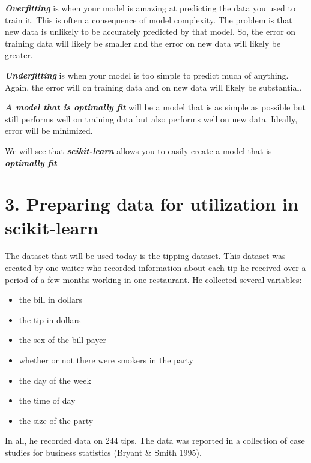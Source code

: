 \documentclass[11pt]{article}
\providecommand{\tightlist}{%
      \setlength{\itemsep}{0pt}\setlength{\parskip}{0pt}}
\begin{document}
    

    \textbf{\emph{Overfitting}} is when your model is amazing at predicting
the data you used to train it. This is often a consequence of model
complexity. The problem is that new data is unlikely to be accurately
predicted by that model. So, the error on training data will likely be
smaller and the error on new data will likely be greater.

    \textbf{\emph{Underfitting}} is when your model is too simple to predict
much of anything. Again, the error will on training data and on new data
will likely be substantial.

    \textbf{\emph{A model that is optimally fit}} will be a model that is as
simple as possible but still performs well on training data but also
performs well on new data. Ideally, error will be minimized.

    We will see that \textbf{\emph{scikit-learn}} allows you to easily
create a model that is \textbf{\emph{optimally fit}}.

    \hypertarget{preparing-data-for-utilization-in-scikit-learn}{%
\section{3. Preparing data for utilization in
scikit-learn}\label{preparing-data-for-utilization-in-scikit-learn}}

    The dataset that will be used today is the
\href{https://drive.google.com/file/d/1JG1dL57ZO-ZyOIIxykP8OCtI58YKC8W4}{tipping
dataset.} This dataset was created by one waiter who recorded
information about each tip he received over a period of a few months
working in one restaurant. He collected several variables:

\begin{itemize}
\tightlist
\item
  the bill in dollars
\item
  the tip in dollars
\item
  the sex of the bill payer
\item
  whether or not there were smokers in the party
\item
  the day of the week
\item
  the time of day
\item
  the size of the party
\end{itemize}

In all, he recorded data on 244 tips. The data was reported in a
collection of case studies for business statistics (Bryant \& Smith
1995).
\end{document}
